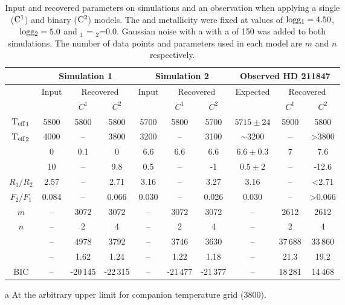 
\begin{table*}
      \centering
      \begin{threeparttable}
          \caption[\textchisquared{} simulation results.]{Input and recovered parameters on simulations and an observation when applying a single (\(\rm C^1\)) and binary (\(\rm C^2\)) models.
              The \logg{} and metallicity were fixed at values of \(\textrm{logg}{}_{1} = 4.50\), \(\textrm{logg}{}_{2}=5.0\) and \feh{}\(_1\) = \feh{}\(_{2}\)=0.0.
              Gaussian noise with a with a \snr{} of 150 was added to both simulations.
              The number of data points and parameters used in each model are \(m\) and \(n\) respectively.}

          \begin{tabular}{c | *3c | *3c | *3c}
              \toprule
              & \multicolumn{3}{c|}{Simulation 1} & \multicolumn{3}{c|}{Simulation 2} & \multicolumn{3}{c}{Observed {HD 211847}} \\
              \midrule
          & Input & \multicolumn{2}{c|}{Recovered} & Input & \multicolumn{2}{c|}{Recovered} & Expected & \multicolumn{2}{c}{Recovered} \\
          & & \(C^1\) & \(C^2\) & & \(C^1\) & \(C^2\) & & \(C^1\)  & \(C^2\) \\
          \midrule
          \({\textrm{T}_{\mathrm{eff}}}_{1}\) & 5800 & 5800 & 5800 & 5700 & 5800 & 5700 & \(5715 \pm 24\) & 5900 & 5800 \\
          \({\textrm{T}_{\mathrm{eff}}}_{2}\) & 4000 & -- & 3800 & 3200 & -- & 3100 & \(\sim\)3200 & -- & >3800\tnote{a} \\
          \Rvone{} & 0 & 0.1 & 0 & 6.6 & 6.6 & 6.6 & \(6.6 \pm 0.3\) & 7 & 7.6 \\
          \Rvtwo{} &  10 & -- & 9.8 & 0.5 & -- & -1 & \(0.5 \pm 2\) & -- & -12.6 \\
          \midrule
          \(R_1/R_2\) & 2.57 & -- & 2.71 & 3.16 & -- & 3.27 & 3.16 & -- & <2.71\tnote{a} \\
          \({F}_{2}/{F}_{1}\) & 0.084 & -- & 0.066 & 0.030 & -- & 0.026 & 0.030 & -- & >0.066\tnote{a} \\
          \(m\) & -- & 3072 & 3072 & -- & 3072 & 3072 & -- & 2612 & 2612 \\
          \(n\) & -- & 2 & 4 & -- & 2 & 4 & -- & 2 & 4 \\
          \textchisquared{} & -- & 4978 & 3792 & -- & 3746 & 3630  & -- & 37\,688 & 33\,860 \\
          \textchisquaredreduced{} & -- & 1.62 & 1.24 & -- & 1.22 & 1.18 & -- & 21.3 & 19.2 \\
          {BIC} & -- & -20\,145 & -22\,315 & -- & -21\,477 & -21\,377 & -- & 18\,281 & 14\,468 \\
          \bottomrule
        \end{tabular}\label{tab:example_params}
        \begin{tablenotes}
            \item [a] {At the arbitrary upper limit for companion temperature grid (3800\K{}).}
        \end{tablenotes}
    \end{threeparttable}
\end{table*}
